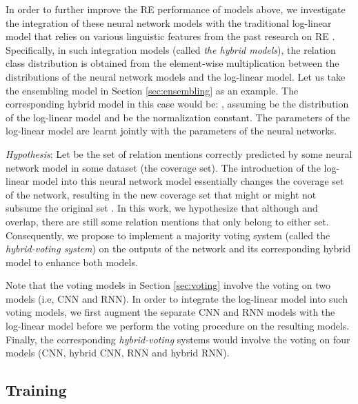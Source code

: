 \documentclass[11pt,letterpaper]{article}
\begin{document}
\label{sec:hybrid}





In order to further improve the RE performance of models above, we investigate the integration of these neural network models with the traditional log-linear model that relies on various linguistic features from the past research on RE \cite{Zhou:05,Sun:11,Gormley:15}. Specifically, in such integration models (called {\it the hybrid models}), the relation class distribution is obtained from the element-wise multiplication between the distributions of the neural network models and the log-linear model. Let us take the ensembling model in Section \ref{sec:ensembling} as an example. The corresponding hybrid model in this case would be:
, assuming  be the distribution of the log-linear model and  be the normalization constant. The parameters of the log-linear model are learnt jointly with the parameters of the neural networks.







{\it Hypothesis}: Let  be the set of relation mentions correctly predicted by some neural network model in some dataset (the coverage set). The introduction of the log-linear model into this neural network model essentially changes the coverage set of the network, resulting in the new coverage set  that might or might not subsume the original set . In this work, we hypothesize that although  and  overlap, there are still some relation mentions that only belong to either set. Consequently, we propose to implement a majority voting system (called the {\it hybrid-voting system}) on the outputs of the network and its corresponding hybrid model to enhance both models. 

Note that the voting models in Section \ref{sec:voting} involve the voting on two models (i.e, CNN and RNN). In order to integrate the log-linear model into such voting models, we first augment the separate CNN and RNN models with the log-linear model before we perform the voting procedure on the resulting models. Finally, the corresponding {\it hybrid-voting} systems would involve the voting on four models (CNN, hybrid CNN, RNN and hybrid RNN).





\subsection{Training}
\end{document}
